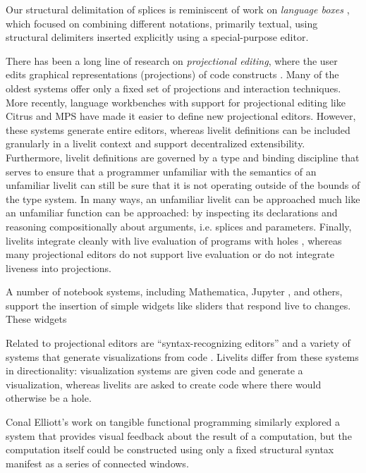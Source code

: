 Our structural delimitation of splices is reminiscent of work on 
\emph{language boxes} \cite{DBLP:conf/sle/RenggliDN09}, which focused on 
combining different notations, primarily textual, using structural delimiters inserted 
explicitly using a special-purpose editor. 

There has been a long line of research on \emph{projectional editing}, where
the user edits graphical representations (projections) of code constructs 
\cite{DBLP:journals/ile/MillerPMV94,read1996generating,DBLP:conf/sde/Reiss84,DBLP:conf/uist/KoM05}. 
Many of the oldest systems offer only a fixed set of projections and interaction techniques. 
More recently, language workbenches with support for projectional editing like Citrus \cite{DBLP:conf/uist/KoM05}
and MPS \cite{voelter2011language} have made it easier to define new projectional editors.
However, these systems generate entire editors, whereas livelit definitions can be 
included granularly in a livelit context and support decentralized extensibility.
Furthermore, livelit definitions are governed by a type and binding discipline that 
serves to ensure that a programmer unfamiliar with the semantics of an unfamiliar livelit
can still be sure that it is not operating outside of the bounds of the type system.
In many ways, an unfamiliar livelit can be approached much like an unfamiliar function
can be approached: by inspecting its declarations and reasoning compositionally 
about arguments, i.e. splices and parameters.
Finally, livelits integrate cleanly with live evaluation of programs with holes \cite{HazelnutLive},
whereas many projectional editors do not support live evaluation or do 
not integrate liveness into projections.

A number of notebook systems, including Mathematica, Jupyter \cite{Guo13}, and others, 
support the insertion of simple widgets like sliders that respond live to changes.
These widgets  

Related to projectional editors are ``syntax-recognizing editors'' \cite{DBLP:journals/tosem/BallanceGV92,DBLP:conf/sde/HorganM84} and 
a variety of systems that generate visualizations from code \cite{DBLP:conf/chi/Lerner20,koschke2003software,urquiza2004survey}. Livelits differ 
from these systems in directionality: visualization systems are given code and generate
a visualization, whereas livelits are asked to create code where there would otherwise
be a hole.

Conal Elliott's work on tangible functional programming \cite{DBLP:conf/icfp/Elliott07} similarly explored a
system that provides visual feedback about the result of a computation, 
but the computation itself could be constructed using only a fixed structural syntax
manifest as a series of connected windows.


